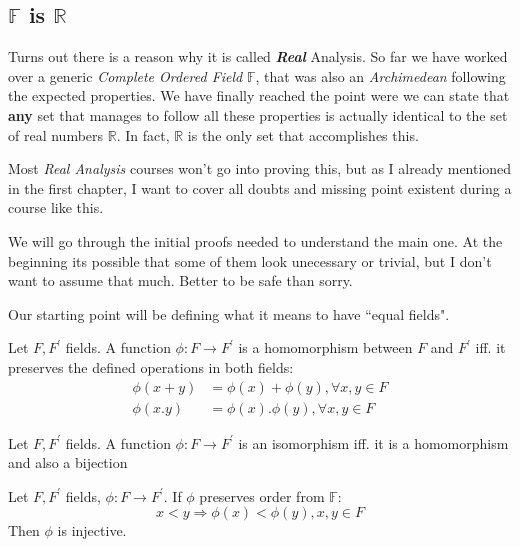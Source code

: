\subsection{$\mathbb{F}$ is $\mathbb{R}$}

Turns out there is a reason why it is called \textbf{\textit{Real}} Analysis. So far we have worked over a generic \textit{Complete Ordered Field} $\mathbb{F}$, that was also an \textit{Archimedean} following the expected properties. We have finally reached the point were we can state that \textbf{any} set that manages to follow all these properties is actually identical to the set of real numbers $\mathbb{R}$. In fact, $\mathbb{R}$ is the only set that accomplishes this.

Most \textit{Real Analysis} courses won't go into proving this, but as I already mentioned in the first chapter, I want to cover all doubts and missing point existent during a course like this.

We will go through the initial proofs needed to understand the main one. At the beginning its possible that some of them look unecessary or trivial, but I don't want to assume that much. Better to be safe than sorry.

Our starting point will be defining what it means to have \textquotedblleft equal fields".

\begin{definition}
Let $F, F^\prime$ fields. A function $\phi: F \rightarrow F^\prime$ is a homomorphism between $F$ and $F^\prime$ iff. it preserves the defined operations in both fields:
\begin{align*}
\phi(x + y) &= \phi(x) + \phi(y), \forall x, y \in F\\
\phi(x . y) &= \phi(x) . \phi(y), \forall x, y \in F
\end{align*}
\end{definition}

\begin{definition}\label{def:field-isomorphism}
Let $F, F^\prime$ fields. A function $\phi: F \rightarrow F^\prime$ is an isomorphism iff. it is a homomorphism and also a bijection
\end{definition}

\begin{lemma}\label{le:inj-by-order}
Let $F, F^\prime$ fields, $\phi: F \rightarrow F^\prime$. If $\phi$ preserves order from $\mathbb{F}$:
$$x < y \Rightarrow \phi(x) < \phi(y), x, y \in F$$
Then $\phi$ is injective.
\end{lemma}


